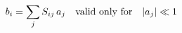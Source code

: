 \documentclass[preview]{standalone}
\begin{document}
\begin{align*}
\special{dvisvgm:raw <g id='unique000'>}b_i = \sum_j S_{ij}\, a_j \quad\text{valid only for}\quad |a_j|\ll 1\special{dvisvgm:raw </g>}
\end{align*}
\end{document}
